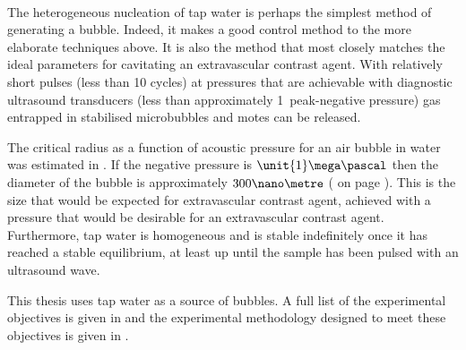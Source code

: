 {\item[Heterogeneous nucleation of tap water:]\hfill \\
  The heterogeneous nucleation of tap water is perhaps the simplest method of generating a bubble.
  Indeed, it makes a good control method to the more elaborate techniques above.
  It is also the method that most closely matches the ideal parameters for cavitating an extravascular contrast agent.
  With relatively short pulses (less than 10 cycles) at pressures that are achievable with diagnostic ultrasound transducers 
  (less than approximately \unit{1}\mega\pascal\ peak-negative pressure)
  gas entrapped in stabilised microbubbles and motes can be released\cite{Willard1953}.
  
  The critical radius as a function of acoustic pressure for an air bubble in water was estimated in .
  If the negative pressure is  $\unit{1}\mega\pascal$ then the diameter of the bubble is approximately $300\nano\metre$
( on page \pageref{fig:cnt:criticalRadius}).
  This is the size that would be expected for extravascular contrast agent,
  achieved with a pressure that would be desirable for an extravascular contrast agent.
  Furthermore, tap water is homogeneous and is stable indefinitely once it has reached a stable equilibrium,
  at least up until the sample has been pulsed with an ultrasound wave.
  
}  
This thesis uses tap water as a source of bubbles.
A full list of the experimental objectives is given in  
and the experimental methodology designed to meet these objectives is given in .



